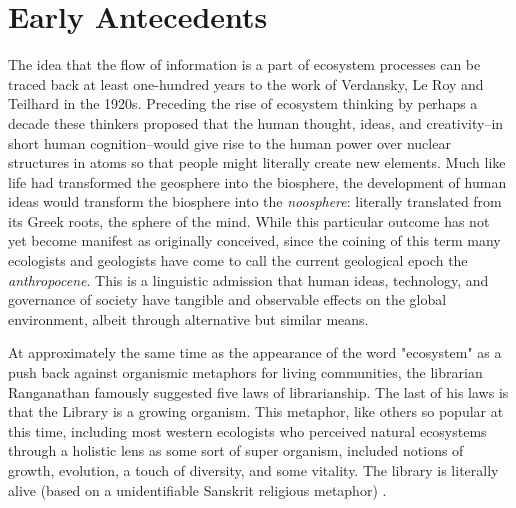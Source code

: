 \section{Early Antecedents}

The idea that the flow of information is a part of ecosystem processes can be traced back at least one-hundred years to the work of Verdansky, Le Roy and Teilhard in the 1920s. Preceding the rise of ecosystem thinking by perhaps a decade these thinkers proposed that the human thought, ideas, and creativity--in short human cognition--would give rise to the human power over nuclear structures in atoms so that people might literally create new elements. Much like life had transformed the geosphere into the biosphere, the development of human ideas would transform the biosphere into the \textit{noosphere}: literally translated from its Greek roots, the sphere of the mind. While this particular outcome has not yet become manifest as originally conceived, since the coining of this term many ecologists and geologists have come to call the current geological epoch the \textit{anthropocene}. This is a linguistic admission that human ideas, technology, and governance of society have tangible and observable effects on the global environment, albeit through alternative but similar means. 

At approximately the same time as the appearance of the word "ecosystem" as a push back against organismic metaphors for living communities, the librarian Ranganathan famously suggested five laws of librarianship. The last of his laws is that the Library is a growing organism. This metaphor, like others so popular at this time, including most western ecologists who perceived natural ecosystems through a holistic lens as some sort of super organism, included notions of growth, evolution, a touch of diversity, and some vitality. The library is literally alive (based on a unidentifiable Sanskrit religious metaphor) \citep{ranganathan_1931}.

